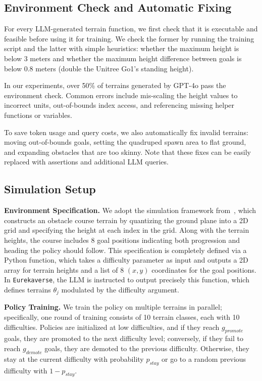 \documentclass{article}
\newcommand{\ourmethod}{\texttt{Eurekaverse}\xspace}
\begin{document}
\subsection{Environment Check and Automatic Fixing}
For every LLM-generated terrain function, we first check that it is executable and feasible before using it for training. We check the former by running the training script and the latter with simple heuristics: whether the maximum height is below 3 meters and whether the maximum height difference between goals is below 0.8 meters (double the Unitree Go1's standing height).

In our experiments, over 50\% of terrains generated by GPT-4o pass the environment check. Common errors include mis-scaling the height values to incorrect units, out-of-bounds index access, and referencing missing helper functions or variables.

To save token usage and query costs, we also automatically fix invalid terrains: moving out-of-bounds goals, setting the quadruped spawn area to flat ground, and expanding obstacles that are too skinny. Note that these fixes can be easily replaced with assertions and additional LLM queries.

\subsection{Simulation Setup}

\textbf{Environment Specification.} We adopt the simulation framework from~\citet{cheng2023extreme}, which constructs an obstacle course terrain by quantizing the ground plane into a 2D grid and specifying the height at each index in the grid. Along with the terrain heights, the course includes 8 goal positions indicating both progression and heading the policy should follow. This specification is completely defined via a Python function, which takes a difficulty parameter as input and outputs a 2D array for terrain heights and a list of 8 $(x, y)$ coordinates for the goal positions. In \ourmethod, the LLM is instructed to output precisely this function, which defines terrains $\theta_j$ modulated by the difficulty argument.

\textbf{Policy Training.} We train the policy on multiple terrains in parallel; specifically, one round of training consists of 10 terrain classes, each with 10 difficulties.  Policies are initialized at low difficulties, and if they reach $g_{promote}$ goals, they are promoted to the next difficulty level; conversely, if they fail to reach $g_{demote}$ goals, they are demoted to the previous difficulty. Otherwise, they stay at the current difficulty with probability $p_{stay}$ or go to a random previous difficulty with $1 - p_{stay}$.
\end{document}

